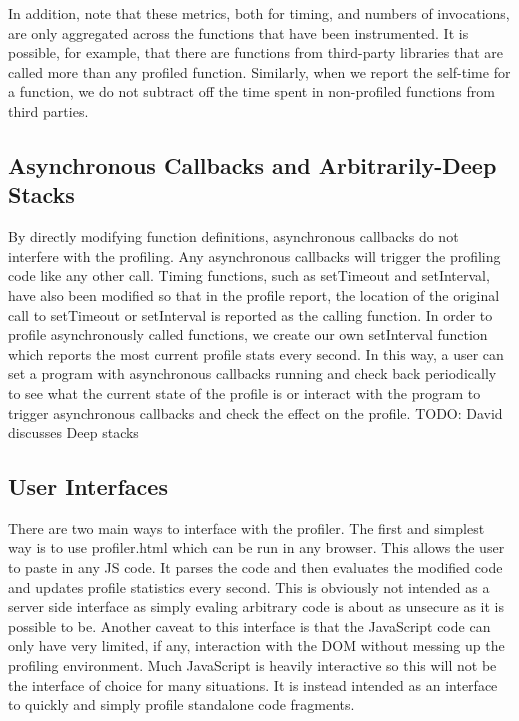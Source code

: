 \documentclass[11pt]{article}
\begin{document}
In addition, note that these metrics, both for timing, and
numbers of invocations, are only aggregated across the functions that
have been instrumented. It is possible, for example, that there are
functions from third-party libraries that are called more than any
profiled function. Similarly, when we report the self-time for a
function, we do not subtract off the time spent in non-profiled
functions from third parties. 


\subsection{Asynchronous Callbacks and Arbitrarily-Deep Stacks}
	By directly modifying function definitions, asynchronous callbacks do not interfere with 
the profiling. Any asynchronous callbacks will trigger the profiling code like any other call. 
Timing functions, such as setTimeout and setInterval, have also been modified so 
that in the profile report, the location of the original call to setTimeout or setInterval 
is reported as the calling function. In order to profile asynchronously called functions, we create
our own setInterval function which reports the most current profile stats every second. In this 
way, a user can set a program with asynchronous callbacks running and check back periodically 
to see what the current state of the profile is or interact with the program to trigger asynchronous 
callbacks and check the effect on the profile. 
TODO: David discusses Deep stacks

\subsection{User Interfaces}
	There are two main ways to interface with the profiler. The first and simplest way is to use 
profiler.html which can be run in any browser. This allows the user to paste in any JS code. It 
parses the code and then evaluates the modified code and updates profile statistics every second. 
This is obviously not intended as a server side interface as simply evaling arbitrary code is 
about as unsecure as it is possible to be. Another caveat to this interface is that the JavaScript 
code can only have very limited, if any, interaction with the DOM without messing up the profiling 
environment. Much JavaScript is heavily interactive so this will not be the interface of choice 
for many situations. It is instead intended as an interface to quickly and simply profile standalone 
code fragments.
\end{document}
